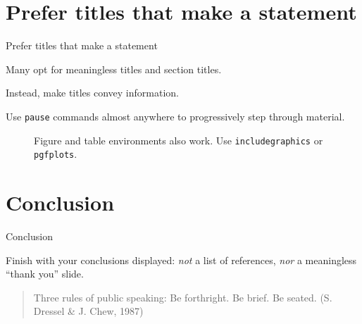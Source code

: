\documentclass[ignorenonframetext,12pt]{beamer}
\begin{document}
\section{Prefer titles that make a statement}
\begin{frame}{Prefer titles that make a statement}

				Many opt for meaningless titles and section titles.  

				Instead, make titles convey information.

				\pause

				Use \texttt{pause} commands almost anywhere to progressively step through material.

				\pause

				\begin{figure}
								\centering
								\caption{Figure and table environments also work.
								Use \texttt{includegraphics} or \texttt{pgfplots}.}
				\end{figure}

\end{frame}




\section{Conclusion}
\begin{frame}{Conclusion}

				Finish with your conclusions displayed: \emph{not} a list of references, \emph{nor} a meaningless ``thank you'' slide.

				\vfill
				\begin{quote}
								Three rules of public speaking: Be forthright.  Be brief.  Be
								seated. \hfill(S. Dressel \& J. Chew, 1987)
				\end{quote}
\end{frame}
\end{document}
